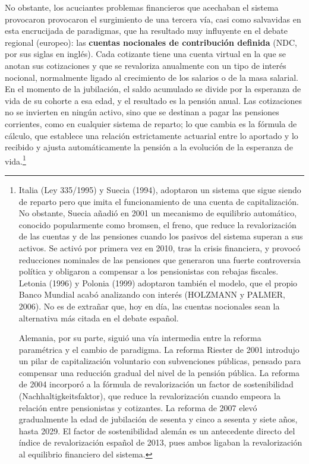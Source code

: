 \documentclass[10pt,a4paper]{article}
\begin{document}
No obstante, los acuciantes problemas financieros que acechaban el sistema provocaron provocaron el surgimiento de una tercera vía, casi como salvavidas en esta encrucijada de paradigmas, que ha resultado muy influyente en el debate regional (europeo): las \textbf{cuentas nocionales de contribución definida} (NDC, por sus siglas en inglés). Cada cotizante tiene una cuenta virtual en la que se anotan sus cotizaciones y que se revaloriza anualmente con un tipo de interés nocional, normalmente ligado al crecimiento de los salarios o de la masa salarial. En el momento de la jubilación, el saldo acumulado se divide por la esperanza de vida de su cohorte a esa edad, y el resultado es la pensión anual. Las cotizaciones no se invierten en ningún activo, sino que se destinan a pagar las pensiones corrientes, como en cualquier sistema de reparto; lo que cambia es la fórmula de cálculo, que establece una relación estrictamente actuarial entre lo aportado y lo recibido y ajusta automáticamente la pensión a la evolución de la esperanza de vida.\footnote{%
    Italia (Ley 335/1995) y Suecia (1994), adoptaron un sistema que sigue siendo de reparto pero que imita el funcionamiento de una cuenta de capitalización. No obstante, Suecia añadió en 2001 un mecanismo de equilibrio automático, conocido popularmente como bromsen, el freno, que reduce la revalorización de las cuentas y de las pensiones cuando los pasivos del sistema superan a sus activos. Se activó por primera vez en 2010, tras la crisis financiera, y provocó reducciones nominales de las pensiones que generaron una fuerte controversia política y obligaron a compensar a los pensionistas con rebajas fiscales. Letonia (1996) y Polonia (1999) adoptaron también el modelo, que el propio Banco Mundial acabó analizando con interés (HOLZMANN y PALMER, 2006). No es de extrañar que, hoy en día, las cuentas nocionales sean la alternativa más citada en el debate español.

Alemania, por su parte, siguió una vía intermedia entre la reforma paramétrica y el cambio de paradigma. La reforma Riester de 2001 introdujo un pilar de capitalización voluntario con subvenciones públicas, pensado para compensar una reducción gradual del nivel de la pensión pública. La reforma de 2004 incorporó a la fórmula de revalorización un factor de sostenibilidad (Nachhaltigkeitsfaktor), que reduce la revalorización cuando empeora la relación entre pensionistas y cotizantes. La reforma de 2007 elevó gradualmente la edad de jubilación de sesenta y cinco a sesenta y siete años, hasta 2029. El factor de sostenibilidad alemán es un antecedente directo del índice de revalorización español de 2013, pues ambos ligaban la revalorización al equilibrio financiero del sistema.
}
\end{document}
